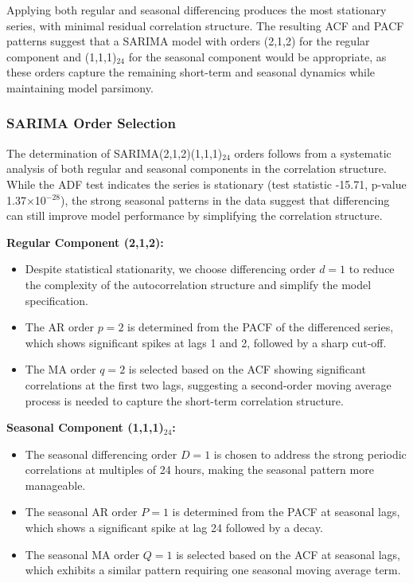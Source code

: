 \documentclass{article}
\begin{document}
Applying both regular and seasonal differencing produces the most stationary series, with minimal residual correlation structure. The resulting ACF and PACF patterns suggest that a SARIMA model with orders (2,1,2) for the regular component and (1,1,1)$_{24}$ for the seasonal component would be appropriate, as these orders capture the remaining short-term and seasonal dynamics while maintaining model parsimony.

\subsubsection{SARIMA Order Selection}
The determination of SARIMA(2,1,2)(1,1,1)$_{24}$ orders follows from a systematic analysis of both regular and seasonal components in the correlation structure. While the ADF test indicates the series is stationary (test statistic -15.71, p-value 1.37×10$^{-28}$), the strong seasonal patterns in the data suggest that differencing can still improve model performance by simplifying the correlation structure.

\textbf{Regular Component (2,1,2):}
\begin{itemize}
    \item Despite statistical stationarity, we choose differencing order $d=1$ to reduce the complexity of the autocorrelation structure and simplify the model specification.
    \item The AR order $p=2$ is determined from the PACF of the differenced series, which shows significant spikes at lags 1 and 2, followed by a sharp cut-off.
    \item The MA order $q=2$ is selected based on the ACF showing significant correlations at the first two lags, suggesting a second-order moving average process is needed to capture the short-term correlation structure.
\end{itemize}

\textbf{Seasonal Component (1,1,1)$_{24}$:}
\begin{itemize}
    \item The seasonal differencing order $D=1$ is chosen to address the strong periodic correlations at multiples of 24 hours, making the seasonal pattern more manageable.
    \item The seasonal AR order $P=1$ is determined from the PACF at seasonal lags, which shows a significant spike at lag 24 followed by a decay.
    \item The seasonal MA order $Q=1$ is selected based on the ACF at seasonal lags, which exhibits a similar pattern requiring one seasonal moving average term.
\end{itemize}
\end{document}
